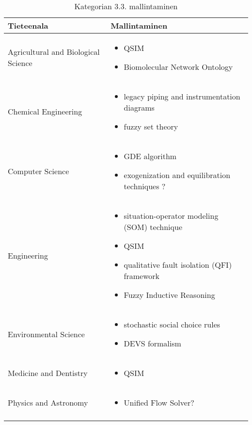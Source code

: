 \documentclass[utf8]{gradu3}
\begin{document}
\begin{longtable}[h]{|p{5cm}|p{8cm}|}
    \hline
    \textbf{Tieteenala}    &    \textbf{Mallintaminen}\\
    \hline
    Agricultural and Biological Science & \begin{itemize}
        \item QSIM
        \item Biomolecular Network Ontology
    \end{itemize} \\
    \hline
    Chemical Engineering & \begin{itemize}
        \item legacy piping and instrumentation diagrams
        \item fuzzy set theory
    \end{itemize} \\
    \hline
    Computer Science & \begin{itemize}
        \item GDE algorithm
        \item exogenization and equilibration techniques ?
    \end{itemize} \\
    \hline
    Engineering & \begin{itemize}
        \item situation-operator modeling (SOM) technique
        \item QSIM
        \item qualitative fault isolation (QFI) framework
        \item Fuzzy Inductive Reasoning
    \end{itemize} \\
    \hline
    Environmental Science & \begin{itemize}
        \item stochastic social choice rules
        \item DEVS formalism
    \end{itemize} \\
    \hline
    Medicine and Dentistry & \begin{itemize}
        \item QSIM
    \end{itemize} \\
    \hline
    Physics and Astronomy & \begin{itemize}
        \item Unified Flow Solver?
    \end{itemize} \\
    \hline
    \caption{Kategorian 3.3. mallintaminen}
    \label{table:Kategorian 3.3. mallintaminen}
\end{longtable}
\end{document}
